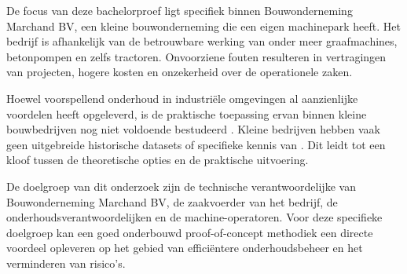De focus van deze bachelorproef ligt specifiek binnen Bouwonderneming Marchan\-d BV, een kleine bouwonderneming die een eigen machinepark heeft. Het bedrijf is afhankelijk van de betrouwbare werking van onder meer graafmachines, betonpompen en zelfs tractoren. Onvoorziene fouten resulteren in vertragingen van projecten, hogere kosten en onzekerheid over de operationele zaken.

Hoewel voorspellend onderhoud in industriële omgevingen al aanzienlijke voordelen heeft opgeleverd, is de praktische toepassing ervan binnen kleine bouwbedrijven nog niet voldoende bestudeerd  \autocite{ErRatby2025, Mahfoud2025}. Kleine bedrijven hebben vaak geen uitgebreide historische datasets of specifieke kennis van \autocite{Elahi2023}. Dit leidt tot een kloof tussen de theoretische opties en de praktische uitvoering.

De doelgroep van dit onderzoek zijn de technische verantwoordelijke van Bouwonderneming Marchand BV, de zaakvoerder van het bedrijf, de onderhoudsverantwoordelijken en de machine-operatoren. Voor deze specifieke doelgroep kan een goed onderbouwd proof-of-concept methodiek een directe voordeel opleveren op het gebied van efficiëntere onderhoudsbeheer en het verminderen van risico's.



